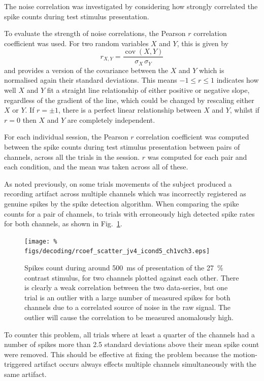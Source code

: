 The noise correlation was investigated by considering how strongly correlated the spike counts during test stimulus presentation.

To evaluate the strength of noise correlations, the Pearson $r$ correlation coefficient was used.
For two random variables $X$ and $Y$, this is given by
$$r_{X,Y} = \frac{\operatorname{cov}(X,Y)}{\sigma_X \, \sigma_Y}$$
and provides a version of the covariance between the $X$ and $Y$ which is normalised again their standard deviations.
This means $-1 \le r \le 1$ indicates how well $X$ and $Y$ fit a straight line relationship of either positive or negative slope, regardless of the gradient of the line, which could be changed by rescaling either $X$ or $Y$.
If $r=\pm1$, there is a perfect linear relationship between $X$ and $Y$, whilst if $r=0$ then $X$ and $Y$ are completely independent.

For each individual session, the Pearson $r$ correlation coefficient was computed between the spike counts during test stimulus presentation between pairs of channels, across all the trials in the session.
$r$ was computed for each pair and each condition, and the mean was taken across all of these.

As noted previously, on some trials movements of the subject produced a recording artifact across multiple channels which was incorrectly registered as genuine spikes by the spike detection algorithm.
When comparing the spike counts for a pair of channels, to trials with erroneously high detected spike rates for both channels, as shown in Fig.~\ref{fig:noise_scatter}.

\begin{figure}[htbp]
\centering\texttt{[image: \%
figs/decoding/rcoef\_scatter\_jv4\_icond5\_ch1vch3.eps]}
\caption{Spikes count during around \SI{500}{ms} of presentation of the \SI{27}{\percent} contrast stimulus, for two channels plotted against each other.
There is clearly a weak correlation between the two data-series, but one trial is an outlier with a large number of measured spikes for both channels due to a correlated source of noise in the raw signal.
The outlier will cause the correlation to be measured anomalously high.}
\label{fig:noise_scatter}
\end{figure}

To counter this problem, all trials where at least a quarter of the channels had a number of spikes more than 2.5 standard deviations above their mean spike count were removed.
This should be effective at fixing the problem because the motion-triggered artifact occurs always effects multiple channels simultaneously with the same artifact.


